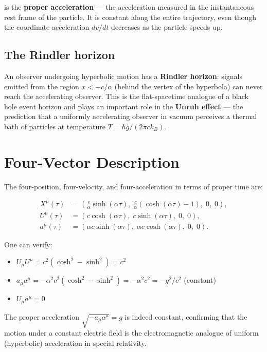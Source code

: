 is the \textbf{proper acceleration} --- the acceleration measured in the instantaneous rest frame of the particle. It is constant along the entire trajectory, even though the coordinate acceleration $dv/dt$ decreases as the particle speeds up.

\subsection{The Rindler horizon}

An observer undergoing hyperbolic motion has a \textbf{Rindler horizon}: signals emitted from the region $x < -c/\alpha$ (behind the vertex of the hyperbola) can never reach the accelerating observer. This is the flat-spacetime analogue of a black hole event horizon and plays an important role in the \textbf{Unruh effect} --- the prediction that a uniformly accelerating observer in vacuum perceives a thermal bath of particles at temperature $T = \hbar g/(2\pi c k_B)$.

\section{Four-Vector Description}

The four-position, four-velocity, and four-acceleration in terms of proper time are:

\begin{align}
X^\mu(\tau) &= \left(\frac{c}{\alpha}\sinh(\alpha\tau),\; \frac{c}{\alpha}(\cosh(\alpha\tau)-1),\; 0,\; 0\right), \\
U^\mu(\tau) &= \left(c\cosh(\alpha\tau),\; c\sinh(\alpha\tau),\; 0,\; 0\right), \\
a^\mu(\tau) &= \left(\alpha c\sinh(\alpha\tau),\; \alpha c\cosh(\alpha\tau),\; 0,\; 0\right).
\end{align}

One can verify:
\begin{itemize}
\item $U_\mu U^\mu = c^2(\cosh^2 - \sinh^2) = c^2$ \checkmark
\item $a_\mu a^\mu = -\alpha^2 c^2(\cosh^2 - \sinh^2) = -\alpha^2 c^2 = -g^2/c^2$ (constant) \checkmark
\item $U_\mu a^\mu = 0$ \checkmark
\end{itemize}

The proper acceleration $\sqrt{-a_\mu a^\mu} = g$ is indeed constant, confirming that the motion under a constant electric field is the electromagnetic analogue of uniform (hyperbolic) acceleration in special relativity.

